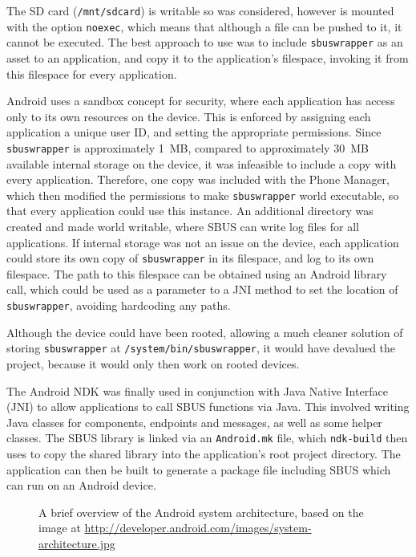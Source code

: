 \documentclass[12pt,twoside,notitlepage]{report}
\begin{document}
The SD card ({\tt /mnt/sdcard}) is writable so was considered, however is mounted with the option {\tt noexec}, which means that although a file can be pushed to it, it cannot be executed. 
The best approach to use was to include {\tt sbuswrapper} as an asset to an application, and copy it to the application's filespace, invoking it from this filespace for every application. 

Android uses a sandbox concept for security, where each application has access only to its own resources on the device. 
This is enforced by assigning each application a unique user ID, and setting the appropriate permissions. 
Since {\tt sbuswrapper} is approximately \SI{1}{MB}, compared to approximately \SI{30}{MB} available internal storage on the device, it was infeasible to include a copy with every application. 
Therefore, one copy was included with the Phone Manager, which then modified the permissions to make {\tt sbuswrapper} world executable, so that every application could use this instance. 
An additional directory was created and made world writable, where SBUS can write log files for all applications. 
If internal storage was not an issue on the device, each application could store its own copy of {\tt sbuswrapper} in its filespace, and log to its own filespace. 
The path to this filespace can be obtained using an Android library call, which could be used as a parameter to a JNI method to set the location of {\tt sbuswrapper}, avoiding hardcoding any paths. 

Although the device could have been rooted, allowing a much cleaner solution of storing {\tt sbuswrapper} at {\tt /system/bin/sbuswrapper}, it would have devalued the project, because it would only then work on rooted devices.


The Android NDK was finally used in conjunction with Java Native Interface (JNI) to allow applications to call SBUS functions via Java. 
This involved writing Java classes for components, endpoints and messages, as well as some helper classes. 
The SBUS library is linked via an {\tt Android.mk} file, which {\tt ndk-build} then uses to copy the shared library into the application's root project directory. 
The application can then be built to generate a package file including SBUS which can run on an Android device. 
 
\begin{figure}[h]
\epsfxsize=8cm
\centerline{}
\caption[Android System Architecture]{A brief overview of the Android system architecture, based on the image at \url{http://developer.android.com/images/system-architecture.jpg}}
\label{fig:android_stack}
\end{figure}
\end{document}
